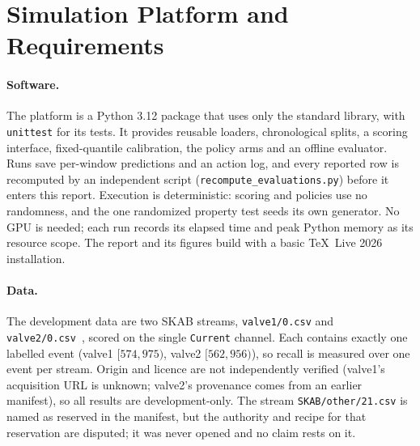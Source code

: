 \section{Simulation Platform and Requirements}\label{sec:platform}

\paragraph{Software.}
The platform is a Python 3.12 package that uses only the standard library, with
\texttt{unittest} for its tests. It provides reusable loaders, chronological splits, a
scoring interface, fixed-quantile calibration, the policy arms and an offline
evaluator. Runs save per-window predictions and an action log, and every reported row
is recomputed by an independent script (\texttt{recompute\_evaluations.py}) before it
enters this report. Execution is deterministic: scoring and policies use no randomness,
and the one randomized property test seeds its own generator. No GPU is needed; each
run records its elapsed time and peak Python memory as its resource scope. The report
and its figures build with a basic \TeX\ Live 2026 installation.

\paragraph{Data.}\Smeasured{}
The development data are two SKAB streams, \texttt{valve1/0.csv} and
\texttt{valve2/0.csv}~\citep{skab2020}, scored on the single \texttt{Current} channel.
Each contains exactly one labelled event (valve1 $[574,975)$, valve2 $[562,956)$), so
recall is measured over one event per stream. Origin and licence are not independently
verified (valve1's acquisition URL is unknown; valve2's provenance comes from an earlier
manifest), so all results are development-only. The stream
\texttt{SKAB/other/21.csv} is named as reserved in the manifest, but the authority and
recipe for that reservation are disputed; it was never opened and no claim rests on it.
